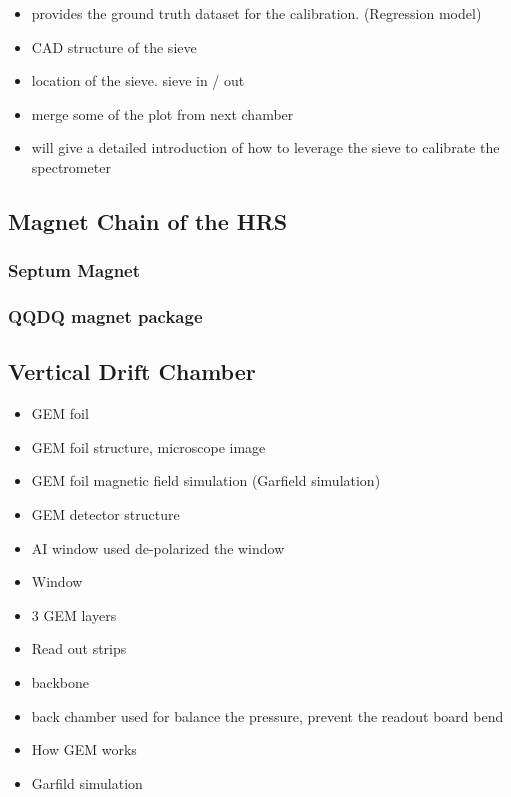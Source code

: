 \begin{itemize}
    \item provides the ground truth dataset for the calibration. (Regression model)
    \item CAD structure of the sieve 
    \item location of the sieve. sieve in / out
    \item merge some of the plot from next chamber
    \item  will give a detailed introduction of how to leverage the sieve to calibrate the spectrometer
\end{itemize}

\subsection{Magnet Chain of the HRS}
\subsubsection{Septum Magnet}
\subsubsection{QQDQ magnet package}
\subsection{Vertical Drift Chamber}

\begin{itemize}
    \item GEM foil
    \item GEM foil structure, microscope image
    \item GEM foil magnetic field simulation (Garfield simulation)
\end{itemize}


\begin{itemize}
    \item GEM detector structure
    \item AI window used de-polarized the window
    \item Window 
    \item 3 GEM layers
    \item Read out strips 
    \item backbone 
    \item back chamber used for balance the pressure, prevent the readout board bend
\end{itemize}


\begin{itemize}
    \item How GEM works
    \item Garfild simulation 
\end{itemize}

